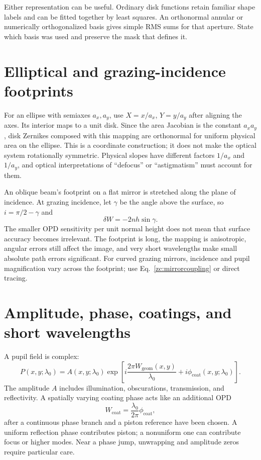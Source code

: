 Either representation can be useful. Ordinary disk functions retain
familiar shape labels and can be fitted together by least squares.
An orthonormal annular or numerically orthogonalized basis gives simple
RMS sums for that aperture. State which basis was used and preserve
the mask that defines it.

\section{Elliptical and grazing-incidence footprints}
For an ellipse with semiaxes $a_x,a_y$, use
$X=x/a_x$, $Y=y/a_y$ after aligning the axes. Its interior maps to a
unit disk. Since the area Jacobian is the constant $a_xa_y$, disk
Zernikes composed with this mapping are orthonormal for uniform
physical area on the ellipse. This is a coordinate construction; it
does not make the optical system rotationally symmetric. Physical
slopes have different factors $1/a_x$ and $1/a_y$, and optical
interpretations of ``defocus'' or ``astigmatism'' must account for them.

An oblique beam's footprint on a flat mirror is stretched along the
plane of incidence. At grazing incidence, let $\gamma$ be the angle
above the surface, so $i=\pi/2-\gamma$ and
\begin{equation}
 \delta W=-2nh\sin\gamma.
\end{equation}
The smaller OPD sensitivity per unit normal height does not mean that
surface accuracy becomes irrelevant. The footprint is long, the
mapping is anisotropic, angular errors still affect the image, and
very short wavelengths make small absolute path errors significant.
For curved grazing mirrors, incidence and pupil magnification vary
across the footprint; use Eq.~\eqref{zc:mirrorcoupling} or direct tracing.

\section{Amplitude, phase, coatings, and short wavelengths}
A pupil field is complex:
\begin{equation}
 P(x,y;\lambda_0)=A(x,y;\lambda_0)
   \exp\left[i\frac{2\pi W_{\mathrm{geom}}(x,y)}{\lambda_0}
                  +i\phi_{\mathrm{coat}}(x,y;\lambda_0)\right].
\end{equation}
The amplitude $A$ includes illumination, obscurations, transmission,
and reflectivity. A spatially varying coating phase acts like an
additional OPD
\begin{equation}
 W_{\mathrm{coat}}=\frac{\lambda_0}{2\pi}\phi_{\mathrm{coat}},
\end{equation}
after a continuous phase branch and a piston reference have been
chosen. A uniform reflection phase contributes piston; a nonuniform
one can contribute focus or higher modes. Near a phase jump, unwrapping
and amplitude zeros require particular care.

